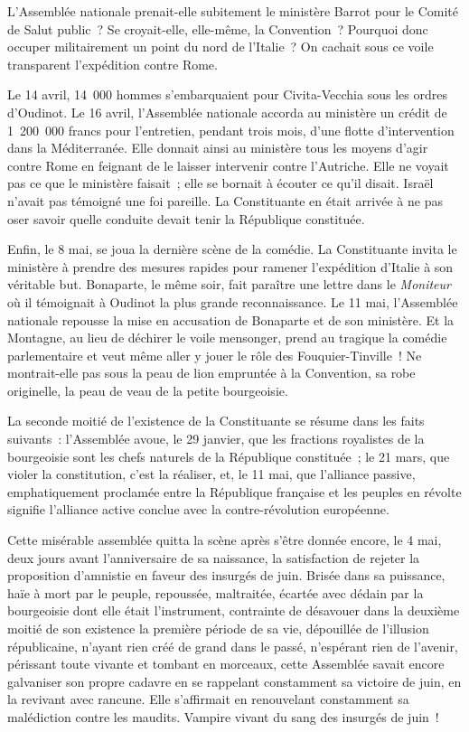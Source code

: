 \documentclass[twoside]{book} %
\begin{document}
L’Assemblée nationale prenait-elle subitement le ministère Barrot pour le Comité de Salut public ? Se croyait-elle, elle-même, la Convention ? Pourquoi donc occuper militairement un point du nord de l’Italie ? On cachait sous ce voile transparent l’expédition contre Rome.\par
Le 14 avril, 14 000 hommes s’embarquaient pour Civita-Vecchia sous les ordres d’Oudinot. Le 16 avril, l’Assemblée nationale accorda au ministère un crédit de 1 200 000 francs pour l’entretien, pendant trois mois, d’une flotte d’intervention dans la Méditerranée. Elle donnait ainsi au ministère tous les moyens d’agir contre Rome en feignant de le laisser intervenir contre l’Autriche. Elle ne voyait pas ce que le ministère faisait ; elle se bornait à écouter ce qu’il disait. Israël n’avait pas témoigné une foi pareille. La Constituante en était arrivée à ne pas oser savoir quelle conduite devait tenir la République constituée.\par
Enfin, le 8 mai, se joua la dernière scène de la comédie. La Constituante invita le ministère à prendre des mesures rapides pour ramener l’expédition d’Italie à son véritable but. Bonaparte, le même soir, fait paraître une lettre dans le \emph{Moniteur} où il témoignait à Oudinot la plus grande reconnaissance. Le 11 mai, l’Assemblée nationale repousse la mise en accusation de Bonaparte et de son ministère. Et la Montagne, au lieu de déchirer le voile mensonger, prend au tragique la comédie parlementaire et veut même aller y jouer le rôle des Fouquier-Tinville ! Ne montrait-elle pas sous la peau de lion empruntée à la Convention, sa robe originelle, la peau de veau de la petite bourgeoisie.\par
La seconde moitié de l’existence de la Constituante se résume dans les faits suivants : l’Assemblée avoue, le 29 janvier, que les fractions royalistes de la bourgeoisie sont les chefs naturels de la République constituée ; le 21 mars, que violer la constitution, c’est la réaliser, et, le 11 mai, que l’alliance passive, emphatiquement proclamée entre la République française et les peuples en révolte signifie l’alliance active conclue avec la contre-révolution européenne.\par
Cette misérable assemblée quitta la scène après s’être donnée encore, le 4 mai, deux jours avant l’anniversaire de sa naissance, la satisfaction de rejeter la proposition d’amnistie en faveur des insurgés de juin. Brisée dans sa puissance, haïe à mort par le peuple, repoussée, maltraitée, écartée avec dédain par la bourgeoisie dont elle était l’instrument, contrainte de désavouer dans la deuxième moitié de son existence la première période de sa vie, dépouillée de l’illusion républicaine, n’ayant rien créé de grand dans le passé, n’espérant rien de l’avenir, périssant toute vivante et tombant en morceaux, cette Assemblée savait encore galvaniser son propre cadavre en se rappelant constamment sa victoire de juin, en la revivant avec rancune. Elle s’affirmait en renouvelant constamment sa malédiction contre les maudits. Vampire vivant du sang des insurgés de juin !\par
\end{document}
